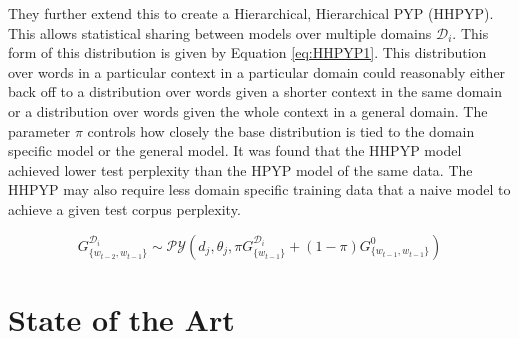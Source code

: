 They further extend this to create a Hierarchical, Hierarchical PYP (HHPYP). This allows statistical sharing between models over multiple domains $\mathcal{D}_{i}$. This form of this distribution is given by Equation \ref{eq:HHPYP1}. This distribution over words in a particular context in a particular domain could reasonably either back off to a distribution over words given a shorter context in the same domain or a distribution over words given the whole context in a general domain. The parameter $\pi$ controls how closely the base distribution is tied to the domain specific model or the general model. It was found that the HHPYP model achieved lower test perplexity than the HPYP model of the same data. The HHPYP may also require less domain specific training data that a naive model to achieve a given test corpus perplexity. 




\begin{equation}
G_{\{w_{t-2},w_{t-1}\}}^{\mathcal{D}_{i}}\sim\mathcal{PY}(d_{j},\theta_{j},\pi G_{\{w_{t-1}\}}^{\mathcal{D}_{i}}+(1-\pi)G_{\{w_{t-1},w_{t-1}\}}^{0})
\label{eq:HHPYP1}
\end{equation}


\section{State of the Art}


